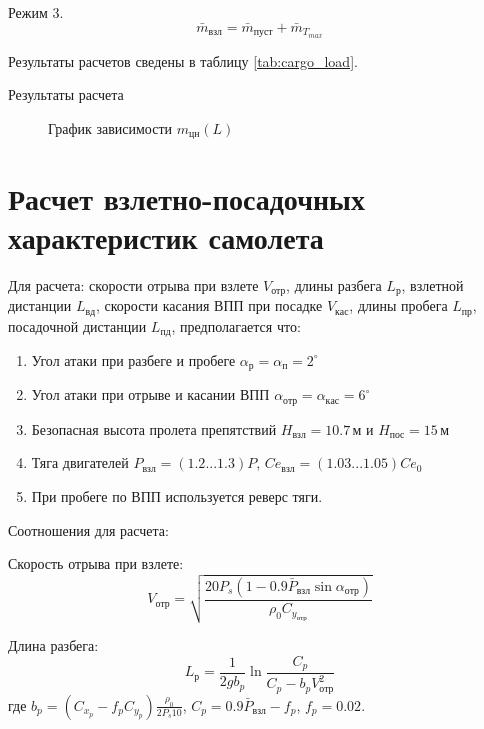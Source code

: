 Режим 3.
\[
    \bar{m}_{взл} = \bar{m}_{пуст} + \bar{m}_{T_{max}}
\]

Результаты расчетов сведены в таблицу \ref{tab:cargo_load}.

\begin{table}[H]
    \centering
    \caption{Результаты расчета}
    \label{tab:cargo_load}
    
\end{table}

\begin{figure}[H]
\centering
\resizebox{.79\linewidth}{!}{}
\caption{График зависимости $m_{цн}(L)$}
\label{fig:m_L}
\end{figure}



\section{Расчет взлетно-посадочных характеристик самолета}
Для расчета: скорости отрыва при взлете $V_{отр}$, длины разбега
$L_{р}$, взлетной дистанции $L_{вд}$, скорости касания ВПП при посадке
$V_{кас}$, длины пробега $L_{пр}$, посадочной дистанции $L_{пд}$, предполагается что:
\begin{enumerate}
    \item Угол атаки при разбеге и пробеге $\alpha_р = \alpha_{п} = 2^\circ$ 
    \item Угол атаки при отрыве и касании ВПП $\alpha_{отр} = \alpha_{кас} = 6^\circ$
    \item Безопасная высота пролета препятствий $H_{взл} = 10.7\, м$ и $H_{пос} = 15\, м$
    \item Тяга двигателей $P_{взл} = (1.2 ... 1.3)P$, $Ce_{взл} = (1.03 ... 1.05) Ce_0$ 
    \item При пробеге по ВПП используется реверс тяги.
\end{enumerate}
Соотношения для расчета:

Скорость отрыва при взлете: 
\begin{equation}
    V_{отр} = \sqrt{\frac{20 P_s (1 - 0.9 \bar{P}_{взл} \sin{\alpha_{отр}})}
    {\rho_0 C_{y_{отр}}}}
\end{equation}

Длина разбега:
\begin{equation}
    L_р = \frac{1}{2 g b_p} \ln{\frac{C_p}{C_p -  b_p V_{отр}^2}} 
\end{equation}
где $b_p = (C_{x_p} - f_p C_{y_p}) \frac{\rho_0}{2 P_s 10}$, $C_p = 0.9
\bar{P}_{взл} - f_p$, $f_p = 0.02$.

